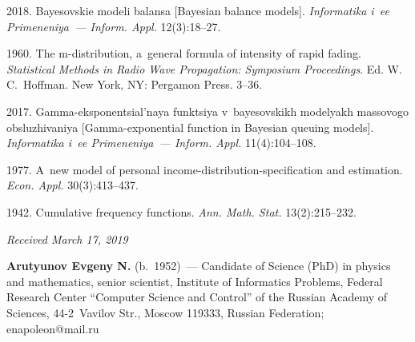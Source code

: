   \begin{multicols}{2}

\renewcommand{\bibname}{\protect\rmfamily References}

{\small\frenchspacing
 {%
 \begin{thebibliography}{9}
 
 \vspace*{-2pt}
 
 2018. Bayesovskie modeli balansa [Bayesian balance models]. 
\textit{Informatika i~ee Primeneniya~--- Inform. Appl.} 12(3):18--27.

 1960. The m-distribution, a~general formula 
of intensity of rapid fading. 
\textit{Statistical Methods in Radio Wave Propagation:  Symposium Proceedings}. Ed. W.\,C.~Hoffman. New York, NY: Pergamon Press. 3--36.

 2017. Gamma-eksponentsial'naya 
funktsiya v~bayesovskikh modelyakh massovogo obsluzhivaniya 
[Gamma-exponential function in Bayesian queuing models]. 
\textit{Informatika i~ee Primeneniya~--- Inform. Appl.} 11(4):104--108.



 1977. A~new model of personal income-distribution-specification and 
estimation. \textit{Econ. Appl.} 30(3):413--437.



 1942. Cumulative frequency functions. 
\textit{Ann. Math. Stat.} 13(2):215--232.
\end{thebibliography}

 }
 }

\end{multicols}

\vspace*{-6pt}

\hfill{\small\textit{Received March 17, 2019}}



\Contr

\noindent
\textbf{Arutyunov Evgeny N.}  (b.\ 1952)~--- 
Candidate of Science (PhD) in 
physics and mathematics, senior scientist, Institute of Informatics Problems, 
Federal Research Center ``Computer Science and Control'' 
of the Russian Academy of Sciences, 44-2~Vavilov Str., Moscow 119333, 
Russian Federation; \mbox{enapoleon@mail.ru} 

